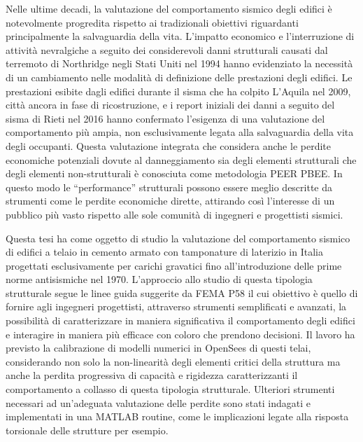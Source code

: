 Nelle ultime decadi, la valutazione del comportamento sismico degli edifici è notevolmente progredita rispetto ai tradizionali obiettivi riguardanti principalmente la salvaguardia della vita. L’impatto economico e l’interruzione di attività nevralgiche a seguito dei considerevoli danni strutturali causati dal terremoto di Northridge negli Stati Uniti nel 1994 hanno evidenziato la necessità di un cambiamento nelle modalità di definizione delle prestazioni degli edifici. Le prestazioni esibite dagli edifici durante il sisma che ha colpito L’Aquila nel 2009, città ancora in fase di ricostruzione, e i report iniziali dei danni a seguito del sisma di Rieti nel 2016 hanno confermato l’esigenza di una valutazione del comportamento più ampia, non esclusivamente legata alla salvaguardia della vita degli occupanti. Questa valutazione integrata che considera anche le perdite economiche potenziali dovute al danneggiamento sia degli elementi strutturali che degli elementi non-strutturali è conosciuta come metodologia PEER PBEE. In questo modo le “performance” strutturali possono essere meglio descritte da strumenti come le perdite economiche dirette, attirando così l’interesse di un pubblico più vasto rispetto alle sole comunità di ingegneri e progettisti sismici.

Questa tesi ha come oggetto di studio la valutazione del comportamento sismico di edifici a telaio in cemento armato con tamponature di laterizio in Italia progettati esclusivamente per carichi gravatici fino all’introduzione delle prime norme antisismiche nel 1970. L’approccio allo studio di questa tipologia strutturale segue le linee guida suggerite da FEMA P58 il cui obiettivo è quello di fornire agli ingegneri progettisti, attraverso strumenti semplificati e avanzati, la possibilità di caratterizzare in maniera significativa il comportamento degli edifici e interagire in maniera più efficace con coloro che prendono decisioni. Il lavoro ha previsto la calibrazione di modelli numerici in OpenSees di questi telai, considerando non solo la non-linearità degli elementi critici della struttura ma anche la perdita progressiva di capacità e rigidezza caratterizzanti il comportamento a collasso di questa tipologia strutturale. Ulteriori strumenti necessari ad un’adeguata valutazione delle perdite sono stati indagati e implementati in una MATLAB routine, come le implicazioni legate alla risposta torsionale delle strutture per esempio. 

